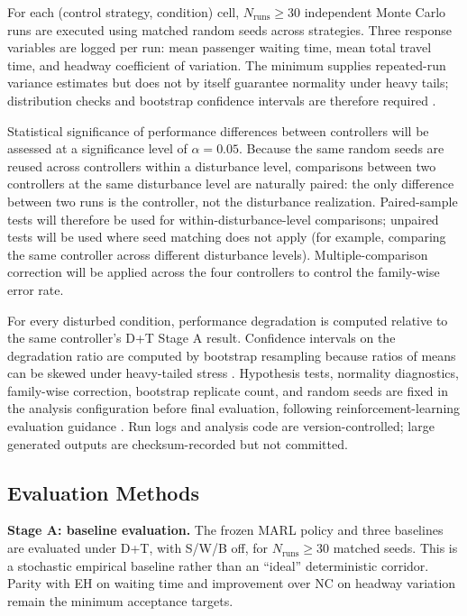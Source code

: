 For each (control strategy, condition) cell, $N_{\mathrm{runs}} \geq 30$ independent Monte Carlo runs are executed using matched random seeds across strategies. Three response variables are logged per run: mean passenger waiting time, mean total travel time, and headway coefficient of variation. The minimum supplies repeated-run variance estimates but does not by itself guarantee normality under heavy tails; distribution checks and bootstrap confidence intervals are therefore required \cite{Wasserman2004,Agarwal2021Precipice}.

Statistical significance of performance differences between controllers will be assessed at a significance level of $\alpha = 0.05$. Because the same random seeds are reused across controllers within a disturbance level, comparisons between two controllers at the same disturbance level are naturally paired: the only difference between two runs is the controller, not the disturbance realization. Paired-sample tests will therefore be used for within-disturbance-level comparisons; unpaired tests will be used where seed matching does not apply (for example, comparing the same controller across different disturbance levels). Multiple-comparison correction will be applied across the four controllers to control the family-wise error rate.

For every disturbed condition, performance degradation is computed relative to the same controller's D+T Stage A result. Confidence intervals on the degradation ratio are computed by bootstrap resampling because ratios of means can be skewed under heavy-tailed stress \cite{EfronTibshirani1993}. Hypothesis tests, normality diagnostics, family-wise correction, bootstrap replicate count, and random seeds are fixed in the analysis configuration before final evaluation, following reinforcement-learning evaluation guidance \cite{Henderson2018Matters,Agarwal2021Precipice}. Run logs and analysis code are version-controlled; large generated outputs are checksum-recorded but not committed.

\subsection{Evaluation Methods}
\label{subsec:evaluation}



\textbf{Stage A: baseline evaluation.} The frozen MARL policy and three baselines are evaluated under D+T, with S/W/B off, for $N_{\mathrm{runs}}\geq30$ matched seeds. This is a stochastic empirical baseline rather than an ``ideal'' deterministic corridor. Parity with EH on waiting time and improvement over NC on headway variation remain the minimum acceptance targets.

